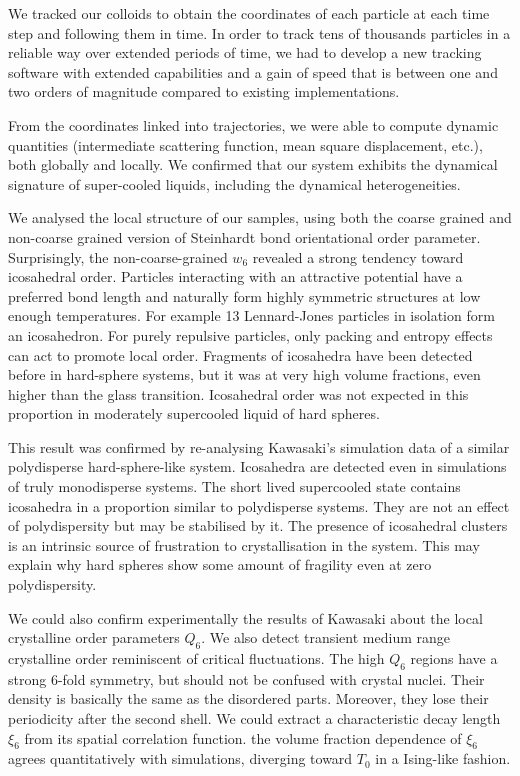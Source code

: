 We tracked our colloids to obtain the coordinates of each particle at each time step and following them in time. In order to track tens of thousands particles in a reliable way over extended periods of time, we had to develop a new tracking software with extended capabilities and a gain of speed that is between one and two orders of magnitude compared to existing implementations.

From the coordinates linked into trajectories, we were able to compute dynamic quantities (intermediate scattering function, mean square displacement, etc.), both globally and locally. We confirmed that our system exhibits the dynamical signature of super-cooled liquids, including the dynamical heterogeneities.

We analysed the local structure of our samples, using both the coarse grained and non-coarse grained version of Steinhardt bond orientational order parameter. Surprisingly, the non-coarse-grained $w_6$ revealed a strong tendency toward icosahedral order. Particles interacting with an attractive potential have a preferred bond length and naturally form highly symmetric structures at low enough temperatures. For example 13 Lennard-Jones particles in isolation form an icosahedron. For purely repulsive particles, only packing and entropy effects can act to promote local order. Fragments of icosahedra have been detected before in hard-sphere systems, but it was at very high volume fractions, even higher than the glass transition. Icosahedral order was not expected in this proportion in moderately supercooled liquid of hard spheres.

This result was confirmed by re-analysing Kawasaki's simulation data of a similar polydisperse hard-sphere-like system. Icosahedra are detected even in simulations of truly monodisperse systems. The short lived supercooled state contains icosahedra in a proportion similar to polydisperse systems. They are not an effect of polydispersity but may be stabilised by it. The presence of icosahedral clusters is an intrinsic source of frustration to crystallisation in the system. This may explain why hard spheres show some amount of fragility even at zero polydispersity.

We could also confirm experimentally the results of Kawasaki about the local crystalline order parameters $Q_6$. We also detect transient medium range crystalline order reminiscent of critical fluctuations. The high $Q_6$ regions have a strong 6-fold symmetry, but should not be confused with crystal nuclei. Their density is basically the same as the disordered parts. Moreover, they lose their periodicity after the second shell. We could extract a characteristic decay length $\xi_6$ from its spatial correlation function. the volume fraction dependence of $\xi_6$ agrees quantitatively with simulations, diverging toward $T_0$ in a Ising-like fashion.

